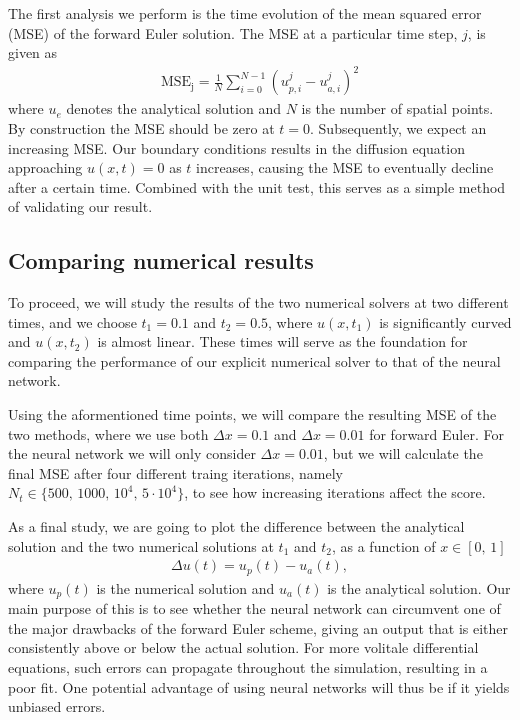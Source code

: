 \documentclass[12pt]{extarticle}
\begin{document}
The first analysis we perform is the time evolution of the mean squared error (MSE) of the forward Euler solution. The MSE at a particular time step, $j$, is given as 
\begin{align} \label{eq:MSE}
	\mathrm{MSE_j} = \frac{1}{N}\sum_{i=0}^{N-1} (u_{p,i}^j - u_{a,i}^j)^2 
\end{align}
where $u_e$ denotes the analytical solution and $N$ is the number of spatial points. By construction the MSE should be zero at $t=0$. Subsequently, we expect an increasing MSE. Our boundary conditions results in the diffusion equation approaching $u(x,t)=0$ as $t$ increases, causing the MSE to eventually decline after a certain time. Combined with the unit test, this serves as a simple method of validating our result.  


\subsection{Comparing numerical results}
To proceed, we will study the results of the two numerical solvers at two different times, and we choose $t_1=0.1$ and $t_2=0.5$, where $u(x,t_1)$ is significantly curved and $u(x,t_2)$ is almost linear. These times will serve as the foundation for comparing the performance of our explicit numerical solver to that of the neural network. 

Using the aformentioned time points, we will compare the resulting MSE of the two methods, where we use both $\Delta x = 0.1$ and $\Delta x = 0.01$ for forward Euler. For the neural network we will only consider $\Delta x = 0.01$, but we will calculate the final MSE after four different traing iterations, namely $N_t\in\{500,\,1000,\,10^4,\,5\cdot10^4\}$, to see how increasing iterations affect the score.   

As a final study, we are going to plot the difference between the analytical solution and the two numerical solutions at $t_1$ and $t_2$, as a function of $x\in[0,\,1]$ 
\begin{align} \label{eq:absolute_difference}
	\Delta u(t) = u_{p}(t) - u_{a}(t),
\end{align}
where $u_p(t)$ is the numerical solution and $u_a(t)$ is the analytical solution. Our main purpose of this is to see whether the neural network can circumvent one of the major drawbacks of the forward Euler scheme, giving an output that is either consistently above or below the actual solution. For more volitale differential equations, such errors can propagate throughout the simulation, resulting in a poor fit. One potential advantage of using neural networks will thus be if it yields unbiased errors. 
\end{document}
